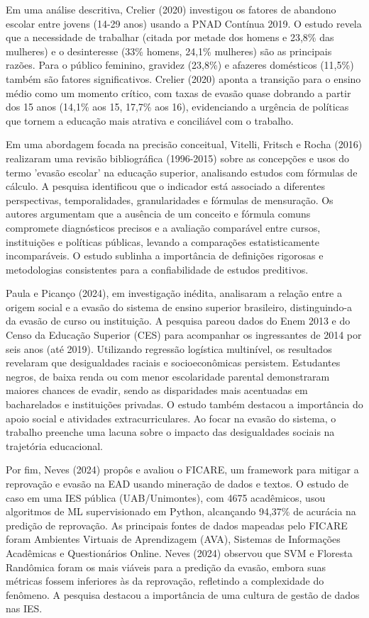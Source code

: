 \documentclass[english, spanish, brazilian]{RBIEarticle} %
\begin{document}
Em uma análise descritiva, Crelier (2020) investigou os fatores de abandono escolar entre jovens (14-29 anos) usando a PNAD Contínua 2019. O estudo revela que a necessidade de trabalhar (citada por metade dos homens e 23,8\% das mulheres) e o desinteresse (33\% homens, 24,1\% mulheres) são as principais razões. Para o público feminino, gravidez (23,8\%) e afazeres domésticos (11,5\%) também são fatores significativos. Crelier (2020) aponta a transição para o ensino médio como um momento crítico, com taxas de evasão quase dobrando a partir dos 15 anos (14,1\% aos 15, 17,7\% aos 16), evidenciando a urgência de políticas que tornem a educação mais atrativa e conciliável com o trabalho.

Em uma abordagem focada na precisão conceitual, Vitelli, Fritsch e Rocha (2016) realizaram uma revisão bibliográfica (1996-2015) sobre as concepções e usos do termo 'evasão escolar' na educação superior, analisando estudos com fórmulas de cálculo. A pesquisa identificou que o indicador está associado a diferentes perspectivas, temporalidades, granularidades e fórmulas de mensuração. Os autores argumentam que a ausência de um conceito e fórmula comuns compromete diagnósticos precisos e a avaliação comparável entre cursos, instituições e políticas públicas, levando a comparações estatisticamente incomparáveis. O estudo sublinha a importância de definições rigorosas e metodologias consistentes para a confiabilidade de estudos preditivos.

Paula e Picanço (2024), em investigação inédita, analisaram a relação entre a origem social e a evasão do sistema de ensino superior brasileiro, distinguindo-a da evasão de curso ou instituição. A pesquisa pareou dados do Enem 2013 e do Censo da Educação Superior (CES) para acompanhar os ingressantes de 2014 por seis anos (até 2019). Utilizando regressão logística multinível, os resultados revelaram que desigualdades raciais e socioeconômicas persistem. Estudantes negros, de baixa renda ou com menor escolaridade parental demonstraram maiores chances de evadir, sendo as disparidades mais acentuadas em bacharelados e instituições privadas. O estudo também destacou a importância do apoio social e atividades extracurriculares. Ao focar na evasão do sistema, o trabalho preenche uma lacuna sobre o impacto das desigualdades sociais na trajetória educacional.

Por fim, Neves (2024) propôs e avaliou o FICARE, um framework para mitigar a reprovação e evasão na EAD usando mineração de dados e textos. O estudo de caso em uma IES pública (UAB/Unimontes), com 4675 acadêmicos, usou algoritmos de ML supervisionado em Python, alcançando 94,37\% de acurácia na predição de reprovação. As principais fontes de dados mapeadas pelo FICARE foram Ambientes Virtuais de Aprendizagem (AVA), Sistemas de Informações Acadêmicas e Questionários Online. Neves (2024) observou que SVM e Floresta Randômica foram os mais viáveis para a predição da evasão, embora suas métricas fossem inferiores às da reprovação, refletindo a complexidade do fenômeno. A pesquisa destacou a importância de uma cultura de gestão de dados nas IES.
\end{document}
